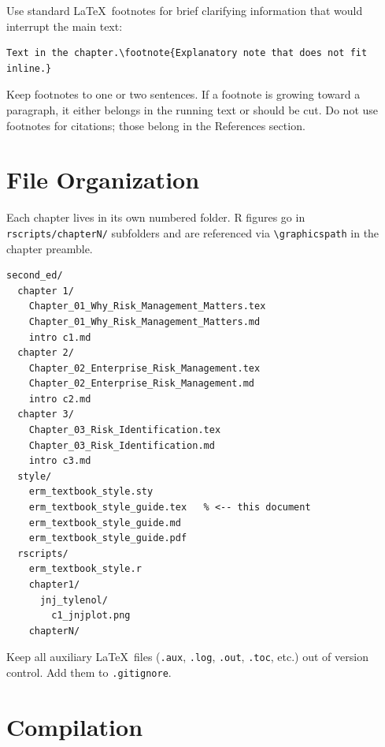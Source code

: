 \documentclass[11pt,openany]{book}
\newcommand{\code}[1]{\texttt{\small #1}}
\begin{document}
Use standard \LaTeX\ footnotes for brief clarifying information that would interrupt the main text:

\begin{lstlisting}
Text in the chapter.\footnote{Explanatory note that does not fit inline.}
\end{lstlisting}

Keep footnotes to one or two sentences. If a footnote is growing toward a paragraph, it either belongs in the running text or should be cut. Do not use footnotes for citations; those belong in the References section.


\section{File Organization}
\label{sec:files}

Each chapter lives in its own numbered folder. R figures go in \code{rscripts/chapterN/} subfolders and are referenced via \code{\textbackslash graphicspath} in the chapter preamble.

\begin{lstlisting}[language={}]
second_ed/
  chapter 1/
    Chapter_01_Why_Risk_Management_Matters.tex
    Chapter_01_Why_Risk_Management_Matters.md
    intro c1.md
  chapter 2/
    Chapter_02_Enterprise_Risk_Management.tex
    Chapter_02_Enterprise_Risk_Management.md
    intro c2.md
  chapter 3/
    Chapter_03_Risk_Identification.tex
    Chapter_03_Risk_Identification.md
    intro c3.md
  style/
    erm_textbook_style.sty
    erm_textbook_style_guide.tex   % <-- this document
    erm_textbook_style_guide.md
    erm_textbook_style_guide.pdf
  rscripts/
    erm_textbook_style.r
    chapter1/
      jnj_tylenol/
        c1_jnjplot.png
    chapterN/
\end{lstlisting}

Keep all auxiliary \LaTeX\ files (\code{.aux}, \code{.log}, \code{.out}, \code{.toc}, etc.) out of version control. Add them to \code{.gitignore}.


\section{Compilation}
\label{sec:compilation}
\end{document}
